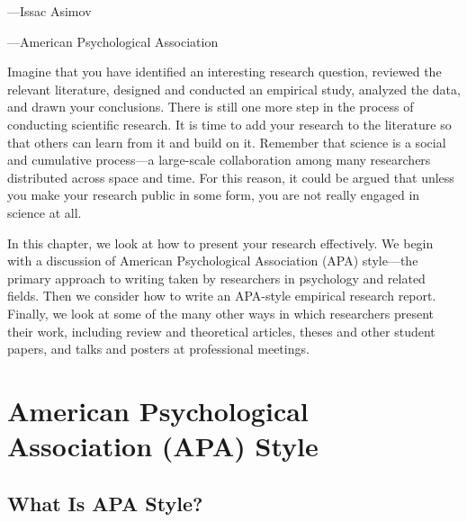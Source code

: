  {---Issac Asimov}

 {---American Psychological Association}


Imagine that you have identified an interesting research question, reviewed the relevant literature, designed and conducted an empirical study, analyzed the data, and drawn your conclusions. There is still one more step in the process of conducting scientific research. It is time to add your research to the literature so that others can learn from it and build on it. Remember that science is a social and cumulative process---a large-scale collaboration among many researchers distributed across space and time. For this reason, it could be argued that unless you make your research public in some form, you are not really engaged in science at all.

In this chapter, we look at how to present your research effectively. We begin with a discussion of American Psychological Association (APA) style---the primary approach to writing taken by researchers in psychology and related fields. Then we consider how to write an APA-style empirical research report. Finally, we look at some of the many other ways in which researchers present their work, including review and theoretical articles, theses and other student papers, and talks and posters at professional meetings.
  

\section{American Psychological Association (APA) Style}


\subsection{What Is APA Style?}

